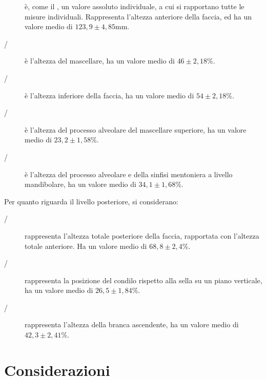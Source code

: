 \begin{description}
\item[] è, come il , un valore assoluto individuale, a cui si rapportano tutte le misure individuali. Rappresenta l'altezza anteriore della faccia, ed ha un valore medio di $123,9 \pm 4,85$mm.
\item[/] è l'altezza del mascellare, ha un valore medio di $46 \pm 2,18$\%.
\item[/] è l'altezza inferiore della faccia, ha un valore medio di $54 \pm 2,18$\%.
\item[/] è l'altezza del processo alveolare del mascellare superiore, ha un valore medio di $23,2 \pm 1,58$\%.
\item[/] è l'altezza del processo alveolare e della sinfisi mentoniera a livello mandibolare, ha un valore medio di $34,1 \pm 1,68$\%.
\end{description}

Per quanto riguarda il livello posteriore, si considerano:

\begin{description}
\item[/] rappresenta l'altezza totale posteriore della faccia, rapportata con l'altezza totale anteriore. Ha un valore medio di $68,8 \pm 2,4$\%.
\item[/] rappresenta la posizione del condilo rispetto alla sella su un piano verticale, ha un valore medio di $26,5 \pm 1,84$\%.
\item[/] rappresenta l'altezza della branca ascendente, ha un valore medio di $42,3 \pm 2,41$\%.
\end{description}

\section{Considerazioni}
